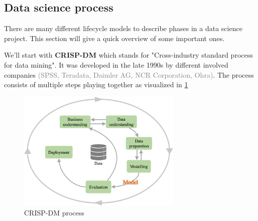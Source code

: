 
\subsection{Data science process}
There are many different lifecycle models to describe phases in a data science project. This section will give a quick overview of some important ones.


We'll start with \textbf{CRISP-DM} which stands for "Cross-industry standard process for data mining". It was developed in the late 1990s by different involved companies \textcolor{gray}{\footnotesize(SPSS, Teradata, Daimler AG, NCR Corporation, Ohra)}. The process consists of multiple steps playing together as visualized in \ref{fig:1_crisp_dm}

\begin{figure}[H]
  \centering
  \includegraphics[width=0.7\textwidth]{assets/basics/crisp-dm.png}
  \caption{CRISP-DM process}
  \label{fig:1_crisp_dm}
\end{figure}

